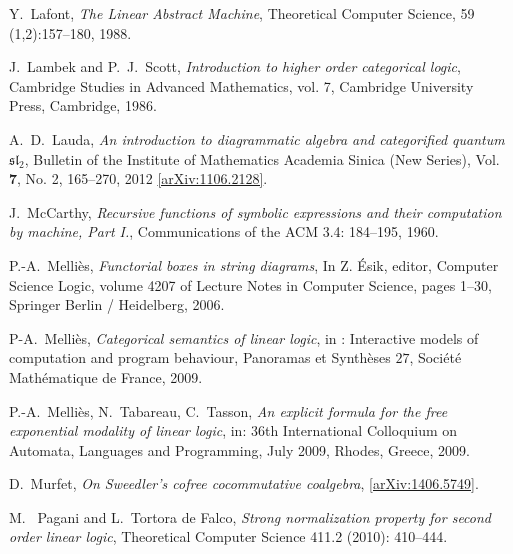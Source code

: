 \documentclass[english,letter paper,12pt,reqno]{article}
\theoremstyle{example}
\numberwithin{equation}{section}
\begin{document}
\begin{thebibliography}{BHLS03}
Y.~Lafont, \textsl{The {L}inear {A}bstract {M}achine}, Theoretical Computer Science, 59 (1,2):157--180, 1988.

J.~Lambek and P.~J.~Scott, \textsl{Introduction to higher order categorical logic}, Cambridge Studies in Advanced Mathematics, vol. 7, Cambridge University Press, Cambridge, 1986.

A.~D.~Lauda, \textsl{An introduction to diagrammatic algebra and categorified quantum $\mathfrak{sl}_2$}, Bulletin of the Institute of Mathematics Academia Sinica (New Series), Vol. \textbf{7}, No. 2, 165--270, 2012 \href{http://arxiv.org/abs/1106.2128}{[arXiv:1106.2128]}.

J.~McCarthy, \textsl{Recursive functions of symbolic expressions and their computation by machine, Part I.}, Communications of the ACM 3.4: 184--195, 1960.

  
P.-A.~Melli\`{e}s, \textsl{Functorial boxes in string diagrams}, In Z. \'{E}sik, editor, Computer Science Logic,
volume 4207 of Lecture Notes in Computer Science, pages 1--30, Springer Berlin / Heidelberg,
2006.

P-A.~Melli\`{e}s, \textsl{Categorical semantics of linear logic}, in : Interactive models of computation and program behaviour, Panoramas et Synth\`{e}ses $27$, Soci\'{e}t\'{e} Math\'{e}matique de France, 2009.

P.-A.~Melli\`{e}s, N.~Tabareau, C.~Tasson, \textsl{An explicit formula for the free exponential modality of linear logic}, in: 36th International Colloquium on Automata, Languages and Programming, July 2009, Rhodes, Greece, 2009.


D.~Murfet, \textsl{On Sweedler's cofree cocommutative coalgebra}, \href{http://arxiv.org/abs/1406.5749}{[arXiv:1406.5749]}.

M.~ Pagani and L.~Tortora de Falco, \textsl{Strong normalization property for second order linear logic}, Theoretical Computer Science 411.2 (2010): 410--444.



\end{thebibliography}
\end{document}

